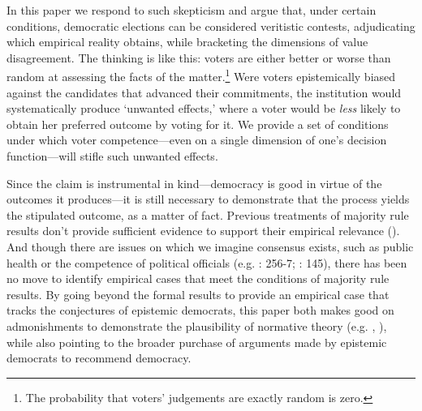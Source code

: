 \documentclass[11pt]{article}
\begin{document}
In this paper we respond to such skepticism and argue that, under certain conditions,
 democratic elections can be considered veritistic contests, adjudicating which empirical reality obtains, while bracketing the dimensions of value disagreement. The thinking is like this: voters are either better or worse than random at assessing the facts of the matter.\footnote{The probability that voters' judgements are exactly random is zero.} Were voters epistemically biased against the candidates that advanced their commitments, the institution would systematically produce `unwanted effects,' where a voter would be \emph{less} likely to obtain her preferred outcome by voting for it. We provide a set of conditions under which voter competence---even on a single dimension of one's decision function---will stifle such unwanted effects.


Since the claim is instrumental in kind---democracy is good in virtue of the outcomes it produces---it is still necessary to demonstrate that the process yields the stipulated outcome, as a matter of fact. Previous treatments of majority rule results don't provide sufficient evidence to support their empirical relevance
(\cite{schwartzberg2015epistemic}). And though there are issues on which we imagine consensus exists, such as public health or the competence of political officials (e.g. \cite{Page2007}: 256-7; \cite{Landemore13}: 145), there has been no move to identify  empirical cases that meet the conditions of majority rule results. By going beyond the formal results to provide an empirical case that tracks the conjectures of epistemic democrats, this paper both makes good on admonishments to demonstrate the plausibility of normative theory (e.g. \cite{rehfeld2010offensive}, \cite{wiens2015against}), while also pointing to the broader purchase of arguments made by epistemic democrats to recommend democracy.
\end{document}

